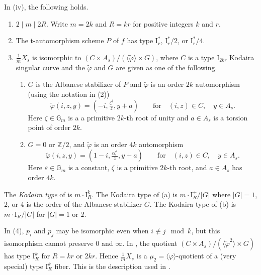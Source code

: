 \documentclass[reqno, letterpaper]{amsart}
\numberwithin{equation}{subsection}
\newcommand{\GG}{\mathbb{G}}
\newcommand{\ZZ}{\mathbb{Z}}
\begin{document}
		\begin{theorem} \label{thm:classification of multiple fiber iv}
			In (iv), the following holds.
			\begin{enumerate}
				\item $2 \mid m \mid 2R$. Write $m = 2k$ and $R = kr$ for positive integers $k$ and $r$.
				\item The t-automorphism scheme $P$ of $f$ has type $\mathrm I^*_r$, $\mathrm I^*_r/2$, or $\mathrm I^*_r/4$.
				\item $\frac{1}{m}X_s$ is isomorphic to $(C \times A_s)/(\langle \tilde \varphi \rangle \times G)$, where $C$ is a type $\mathrm I_{2kr}$ Kodaira singular curve and the $\tilde \varphi$ and $G$ are given as one of the following.
				\begin{enumerate}
					\item[\textnormal{($\mathrm I^+_R$)}] $G$ is the Albanese stabilizer of $P$ and $\tilde \varphi$ is an order $2k$ automorphism (using the notation in (2))
					\[ \tilde \varphi(i,z,y) = (-i, \tfrac{\zeta^i}{z}, y+a) \qquad\mbox{for}\quad (i,z) \in C ,\quad y \in A_s .\]
					Here $\zeta \in \GG_m$ is a a primitive $2k$-th root of unity and $a \in A_s$ is a torsion point of order $2k$.
					
					\item[\textnormal{($\mathrm I^-_R$)}] $G = 0$ or $\ZZ/2$, and $\tilde \varphi$ is an order $4k$ automorphism
					\[ \tilde \varphi(i,z,y) = (1-i, \tfrac{\varepsilon \zeta^i}{z}, y+a) \qquad\mbox{for}\quad (i,z) \in C ,\quad y \in A_s .\]
					Here $\varepsilon \in \GG_m$ is a constant, $\zeta$ is a primitive $2k$-th root, and $a \in A_s$ has order $4k$.
				\end{enumerate}
			\end{enumerate}
		\end{theorem}
		
		\begin{definition}
			The \emph{Kodaira type} of  is $m \cdot \mathrm I^k_R$. The Kodaira type of (a) is $m \cdot \mathrm I^+_R/|G|$ where $|G| = 1$, $2$, or $4$ is the order of the Albanese stabilizer $G$. The Kodaira type of (b) is $m \cdot \mathrm I^-_R/|G|$ for $|G| = 1$ or $2$.
		\end{definition}
		
		\begin{remark}
			In (4), $p_i$ and $p_j$ may be isomorphic even when $i \not \equiv j \mod k$, but this isomorphism cannot preserve $0$ and $\infty$. In , the quotient $(C \times A_s)/(\langle \tilde \varphi^2 \rangle \times G)$ has type $\mathrm I^k_R$ for $R = kr$ or $2kr$. Hence $\frac{1}{m} X_s$ is a $\mu_2 = \langle \varphi \rangle$-quotient of a (very special) type $\mathrm I^k_R$ fiber. This is the description used in .
		\end{remark}
		
\end{document}
